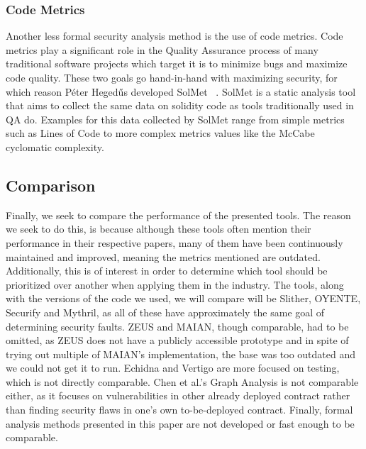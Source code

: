 \documentclass[letterpaper,twocolumn,10pt]{article}
\begin{document}
\subsubsection{Code Metrics}
Another less formal security analysis method is the use of code metrics. Code metrics play a significant role in the Quality Assurance process of many traditional software projects which target it is to minimize bugs and maximize code quality. These two goals go hand-in-hand with maximizing security, for which reason Péter Hegedűs developed SolMet ~\cite{hegedűs_2019}. SolMet is a static analysis tool that aims to collect the same data on solidity code as tools traditionally used in QA do. Examples for this data collected by SolMet range from simple metrics such as Lines of Code to more complex metrics values like the McCabe cyclomatic complexity.

\subsection{Comparison}
Finally, we seek to compare the performance of the presented tools. The reason we seek to do this, is because although these tools often mention their performance in their respective papers, many of them have been continuously maintained and improved, meaning the metrics mentioned are outdated. Additionally, this is of interest in order to determine which tool should be prioritized over another when applying them in the industry. The tools, along with the versions of the code we used, we will compare will be Slither\cite{Slither}, OYENTE\cite{oyente}, Securify\cite{securify} and Mythril\cite{mythril}, as all of these have approximately the same goal of determining security faults. ZEUS and MAIAN, though comparable, had to be omitted, as ZEUS does not have a publicly accessible prototype and in spite of trying out multiple of MAIAN's implementation, the base was too outdated and we could not get it to run.
Echidna and Vertigo are more focused on testing, which is not directly comparable. Chen et al.'s Graph Analysis is not comparable either, as it focuses on vulnerabilities in other already deployed contract rather than finding security flaws in one's own to-be-deployed contract. Finally, formal analysis methods presented in this paper are not developed or fast enough to be comparable.
\end{document}
